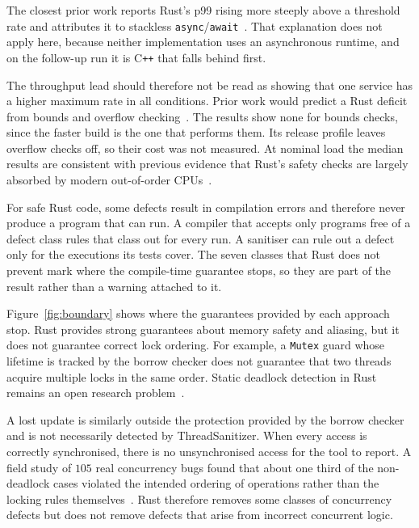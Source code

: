 \documentclass[english,oneside,a4paper,censored,csm,software-track-2020]{HYthesisML}
\begin{document}
The closest prior work reports Rust's p99 rising more steeply above a threshold
rate and attributes it to stackless
\texttt{async}/\texttt{await}~\cite{arvidsson2025async}. That explanation does
not apply here, because neither implementation uses an asynchronous runtime, and
on the follow-up run it is C\texttt{++} that falls behind first.

The throughput lead should therefore not be read as showing that one service
has a higher maximum rate in all conditions. Prior work would predict a Rust
deficit from bounds and overflow checking~\cite{zhang2022runtime,harris2023morello}.
The results show none for bounds checks, since the faster build is the one that performs
them. Its release profile leaves overflow checks off, so their cost was not measured.
At nominal load the median results are consistent with previous evidence that
Rust's safety checks are largely absorbed by modern out-of-order
CPUs~\cite{balasubramanian2017rust,emmerich2019drivers}.

For safe Rust code, some defects result in compilation errors and therefore
never produce a program that can run. A compiler that accepts only programs
free of a defect class rules that class out for every run. A sanitiser can rule
out a defect only for the executions its tests cover. The seven classes that
Rust does not prevent mark where the compile-time guarantee stops, so they are
part of the result rather than a warning attached to it.

Figure~\ref{fig:boundary} shows where the guarantees provided by each
approach stop. Rust provides strong guarantees about memory safety and
aliasing, but it does not guarantee correct lock ordering. For example, a
\texttt{Mutex} guard whose lifetime is tracked by the borrow checker does not
guarantee that two threads acquire multiple locks in the same order. Static
deadlock detection in Rust remains an open research
problem~\cite{zhang2026deadlock}.

A lost update is similarly outside the protection provided by the borrow
checker and is not necessarily detected by ThreadSanitizer. When every access
is correctly synchronised, there is no unsynchronised access for the tool to
report. A field study of $105$ real concurrency bugs found that about one third
of the non-deadlock cases violated the intended ordering of operations rather
than the locking rules themselves~\cite{lu2008mistakes}. Rust therefore removes
some classes of concurrency defects but does not remove defects that arise from
incorrect concurrent logic.
\end{document}
